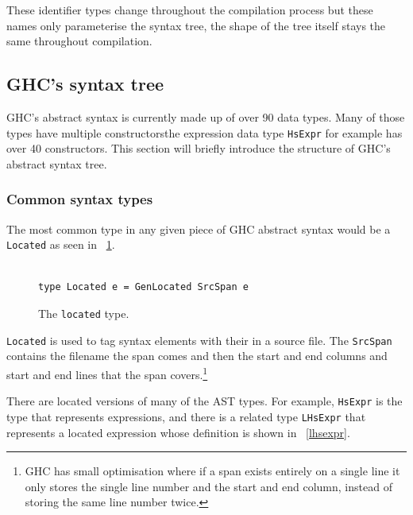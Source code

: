 These identifier types change throughout the compilation process but these names only parameterise the syntax tree, the shape of the tree itself stays the same throughout compilation. 

\subsection{GHC's syntax tree}
GHC's abstract syntax is currently made up of over 90 data types. Many of those types have multiple constructors\DIFdelbegin \DIFdel{, }\DIFdelend \DIFaddbegin \DIFadd{; }\DIFaddend the expression data type \texttt{HsExpr} for example has over 40 constructors. This section will briefly introduce the structure of GHC's abstract syntax tree.

\subsubsection{Common syntax types}

The most common type in any given piece of GHC abstract syntax would be a \texttt{Located} as seen in \DIFdelbegin {}\DIFdelend \DIFaddbegin {}\DIFaddend ~\ref{located}.

\begin{figure}[t]
\begin{lstlisting}

type Located e = GenLocated SrcSpan e

\end{lstlisting}
\caption{The \texttt{located} type.}
\label{located}
\end{figure}

\texttt{Located} is used to tag syntax elements with their \DIFdelbegin {}\DIFdelend \DIFaddbegin {}\DIFaddend in a source file. The \texttt{SrcSpan} contains the filename \DIFdelbegin {}\DIFdelend \DIFaddbegin {}\DIFaddend the span comes \DIFdelbegin {}\DIFdelend and then the start and end columns and start and end lines that the span covers.\footnote{GHC has small optimisation where if a span exists entirely on a single line it only stores the single line number and the start and end column, instead of storing the same line number twice.} 

There are located versions of many of the AST types. For example, \texttt{HsExpr} is the type that represents expressions, and there is a related type \texttt{LHsExpr} that represents a located expression whose definition is shown in \DIFdelbegin {}\DIFdelend \DIFaddbegin {}\DIFaddend ~\ref{lhsexpr}.

